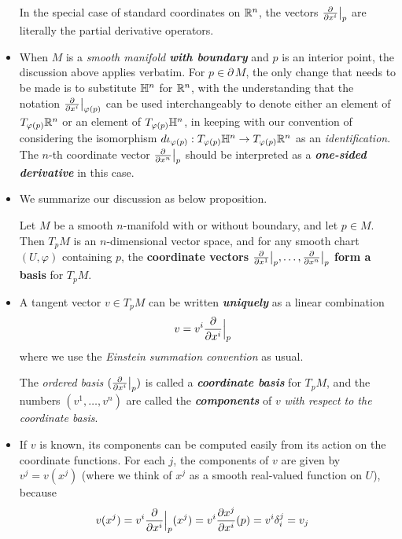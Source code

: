 \documentclass[11pt]{article}
\begin{document}
\begin{itemize}
In the special case of standard coordinates on ${\mathbb R}^n$, the vectors $\frac{\partial }{ \partial x^{i}}\big|_{p}$ are literally the partial derivative operators.

\item When $M$ is a \emph{smooth manifold \textbf{with boundary}} and $p$ is an interior point, the discussion above applies verbatim. For $p \in \partial\,M$, the only change that needs to be made is to substitute ${\mathbb H}^n$ for ${\mathbb R}^n$, with the understanding that the notation $\frac{\partial }{ \partial x^{i}}\big|_{\varphi(p)}$ can be used interchangeably to denote either an element of $T_{\varphi(p)}{\mathbb R}^n$ or an element of $T_{\varphi(p)}{\mathbb H}^n$, in keeping with our convention of considering the isomorphism $d\iota_{\varphi(p)}: T_{\varphi(p)}{\mathbb H}^n \rightarrow T_{\varphi(p)}{\mathbb R}^n$ as an \emph{identification}. The $n$-th coordinate vector $\frac{\partial }{ \partial x^{n}}\big|_{p}$ should be interpreted as a \emph{\textbf{one-sided derivative}} in this case.

\item We summarize our discussion as below proposition.
\begin{proposition}
Let $M$ be a smooth $n$-manifold with or without boundary, and let $p \in M$. Then $T_{p}M$ is an $n$-dimensional vector space, and for any smooth chart $(U, \varphi)$ containing $p$, the \textbf{coordinate vectors} $\frac{\partial }{ \partial x^{1}}\big|_{p}, \ldots, \frac{\partial }{ \partial x^{n}}\big|_{p}$ \textbf{form a basis} for $T_{p}M$.
\end{proposition}

\item 
\begin{definition}
A tangent vector $v \in T_{p}M$ can be written \textbf{\emph{uniquely}} as a linear combination
\begin{align}
v&=v^{i} \frac{\partial }{ \partial x^{i}}\Bigr|_{p} \label{eqn: tangent_vec_decomp}
\end{align} where we use the \emph{Einstein summation convention} as usual. 

The \emph{ordered basis} $(\frac{\partial }{ \partial x^{i}}\big|_{p})$ is called a \emph{\textbf{coordinate basis}} for $T_{p}M$, and the numbers $(v^1, \ldots, v^n)$ are called the \emph{\textbf{components}} of $v$ \emph{with respect to the coordinate basis}.
\end{definition}

\item If $v$ is known, its components can be computed easily from its action on the coordinate functions. For each $j$, the components of $v$ are given by $v^j = v(x^{j})$ (where we think of $x^j$ as a smooth real-valued function on $U$), because
\begin{align*}
v(x^{j}) &= v^{i} \frac{\partial }{ \partial x^{i}}\Bigr|_{p}(x^{j}) = v^{i} \frac{\partial x^{j}}{ \partial x^{i}}(p) = v^{i}\delta_{i}^{j} = v_{j}
\end{align*}
\end{itemize}
\end{document}
